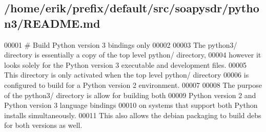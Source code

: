 \subsection{/home/erik/prefix/default/src/soapysdr/python3/\+R\+E\+A\+D\+ME.md}

\begin{DoxyCode}
00001 # Build Python version 3 bindings only
00002 
00003 The python3/ directory is essentially a copy of the top level python/ directory,
00004 however it looks solely for the Python version 3 executable and development files.
00005 This directory is only activated when the top level python/ directory
00006 is configured to build for a Python version 2 environment.
00007 
00008 The purpose of the python3/ directory is allow for building both
00009 Python version 2 and Python version 3 language bindings
00010 on systems that support both Python installs simultaneously.
00011 This also allows the debian packaging to build debs for both versions as well.
\end{DoxyCode}
